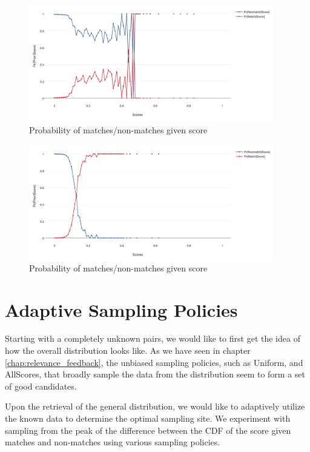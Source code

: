 \begin{figure}[ht]
  \centering
  \includegraphics[width=0.95\textwidth]{dataset/grand/pms}
  \caption{Probability of matches/non-matches given score}
  \label{fig:grand_pms} %
\end{figure}

\begin{figure}[ht]
  \centering
  \includegraphics[width=0.95\textwidth]{dataset/otago/pms}
  \caption{Probability of matches/non-matches given score}
  \label{fig:otago_pms} %
\end{figure}

\section{Adaptive Sampling Policies} %
\label{sec:sampling_policies}

Starting with a completely unknown pairs, we would like to first get the idea
of how the overall distribution looks like. As we have seen in chapter
\ref{chap:relevance_feedback}, the unbiased sampling policies, such as Uniform,
and AllScores, that broadly sample the data from the distribution seem to form
a set of good candidates.

Upon the retrieval of the general distribution, we would like to adaptively
utilize the known data to determine the optimal sampling site. We experiment
with sampling from the peak of the difference between the CDF of the score
given matches and non-matches using various sampling policies.

